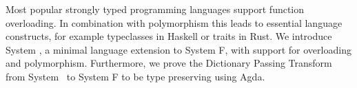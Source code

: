 Most popular strongly typed programming languages support function overloading. 
In combination with polymorphism this leads to essential language constructs, for example typeclasses in Haskell or traits in Rust.  
We introduce System \Fo, a minimal language extension to System F, with support for overloading and polymorphism.
Furthermore, we prove the Dictionary Passing Transform from System \Fo\ to System F to be type preserving using Agda.
